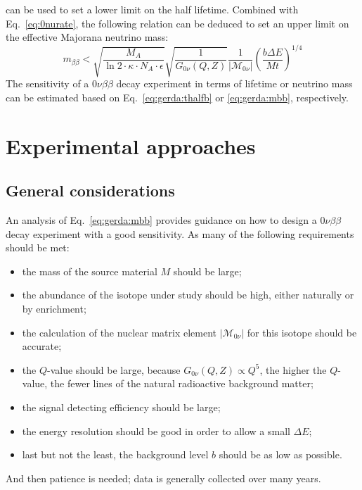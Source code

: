can be used to set a lower limit on the half lifetime. Combined with Eq.~\ref{eq:0nurate}, the following relation can be deduced to set an upper limit on the effective Majorana neutrino mass:
\begin{equation}
  \label{eq:gerda:mbb}
  m_{\beta\beta} < \sqrt{\frac{M_{A}}{\ln2 \cdot \kappa \cdot N_{A} \cdot \epsilon}} \sqrt{\frac{1}{G_{0\nu}(Q,Z)}} \frac{1}{|\mathcal{M}_{0\nu}|} (\frac{b \Delta E}{M t})^{1/4}
\end{equation}
The sensitivity of a
$0\nu\beta\beta$ decay experiment in terms of lifetime or neutrino mass can be estimated based on Eq.~\ref{eq:gerda:thalfb} or \ref{eq:gerda:mbb}, respectively.

\section{Experimental approaches}
\label{sec:exp:appr}
\subsection{General considerations}
\label{sec:gencon}
An analysis of Eq.~\ref{eq:gerda:mbb} provides guidance on how to design a $0\nu\beta\beta$ decay experiment with a good sensitivity. As many of the following requirements should be met:
\begin{itemize}
\item the mass of the source material $M$ should be large;
\item the abundance of the isotope under study should be high, either naturally or by enrichment;
\item the calculation of the nuclear matrix element $|\mathcal{M}_{0\nu}|$ for this isotope should be accurate;
\item the $Q$-value should be large, because $G_{0\nu}(Q,Z) \propto Q^{5}$, the higher the $Q$-value, the fewer lines of the natural radioactive background matter;
\item the signal detecting efficiency should be large;
\item the energy resolution should be good in order to allow a small $\Delta E$;
\item last but not the least, the background level $b$ should be as low as possible.
\end{itemize}
And then patience is needed; data is generally collected over many years.

